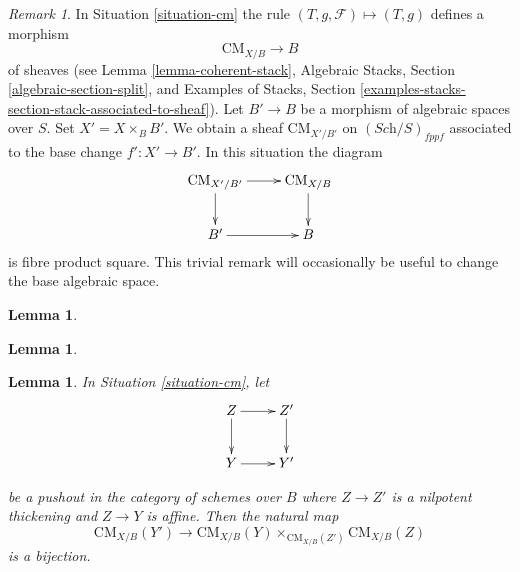\documentclass{stacks-project}
\theoremstyle{plain}
\newtheorem{lemma}[subsection]{Lemma}
\theoremstyle{definition}
\theoremstyle{remark}
\newtheorem{remark}[subsection]{Remark}
\numberwithin{equation}{subsection}
\def\Sch{\textit{Sch}}
\def\CMfunctor{\mathcal{C}\!{\it oh}}
\def\CMfunctor{\text{CM}}
\begin{document}
\begin{remark}
	\label{remark-cm-base-change}
	In Situation \ref{situation-cm} the rule
$(T, g, \mathcal{F}) \mapsto (T, g)$ defines a morphism
$$
\CMfunctor_{X/B} \longrightarrow B
$$
of sheaves
(see Lemma \ref{lemma-coherent-stack},
Algebraic Stacks, Section \ref{algebraic-section-split}, and
Examples of Stacks, Section
\ref{examples-stacks-section-stack-associated-to-sheaf}).
Let $B' \to B$ be a morphism of
algebraic spaces over $S$.
Set $X' = X \times_B B'$.
We obtain a sheaf $\CMfunctor_{X'/B'}$ on  $(\Sch/S)_{fppf}$
associated to the base change $f' : X' \to B'$. In this situation
the diagram
$$
\vcenter{
\xymatrix{
\CMfunctor_{X'/B'} \ar[r] \ar[d] & \CMfunctor_{X/B} \ar[d] \\
B' \ar[r] & B
}
}
$$
is fibre product square. This trivial remark
will occasionally be useful to change the base algebraic space.
\end{remark}
\begin{lemma}
	
	\label{lemma-sm-stack}
\end{lemma}
\begin{lemma}
	
	\label{lemma-cm-limits}
\end{lemma}


\begin{lemma}
In Situation \ref{situation-cm}, let 
$$
\xymatrix{
Z \ar[r] \ar[d] & Z' \ar[d] \\
Y \ar[r] & Y'}
$$

be a pushout in the category of schemes over $B$ where $Z\to Z'$ is a nilpotent thickening and $Z \to Y$ is affine. Then the natural map
$$
\CMfunctor_{X/B}(Y') \longrightarrow \CMfunctor_{X/B}(Y) \times_{\CMfunctor_{X/B}(Z')} \CMfunctor_{X/B}(Z)
$$ is a bijection.

\label{lemma-cm-RS-star}
\end{lemma}
\end{document}
